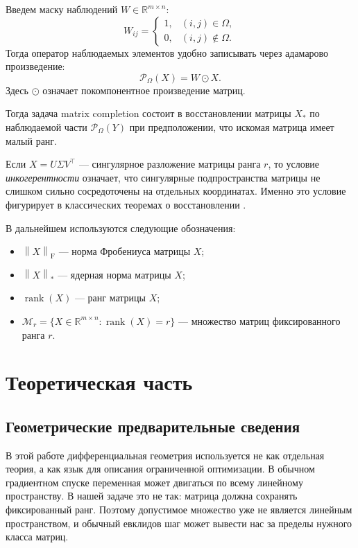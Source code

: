 \documentclass[a4paper,12pt]{article}
\newcommand{\R}{\mathbb{R}}
\newcommand{\fro}[1]{\left\lVert #1 \right\rVert_{\mathrm F}}
\newcommand{\nuc}[1]{\left\lVert #1 \right\rVert_*}
\newcommand{\rank}{\operatorname{rank}}
\renewcommand{\Proj}{\mathcal{P}}
\newcommand{\Mcal}{\mathcal{M}}
\begin{document}
\begin{definition}
Введем маску наблюдений $W\in\R^{m\times n}$:
\[
W_{ij} =
\begin{cases}
1, & (i,j)\in\Omega,\\
0, & (i,j)\notin\Omega.
\end{cases}
\]
Тогда оператор наблюдаемых элементов удобно записывать через адамарово произведение:
\[
\Proj_\Omega(X)=W\odot X.
\]
Здесь $\odot$ означает покомпонентное произведение матриц.
\end{definition}

Тогда задача matrix completion состоит в восстановлении матрицы $X_*$ по наблюдаемой части $\Proj_\Omega(Y)$ при предположении, что искомая матрица имеет малый ранг.

\begin{definition}
Если $X = U\Sigma V^\top$ --- сингулярное разложение матрицы ранга $r$, то условие \textit{инкогерентности} означает, что сингулярные подпространства матрицы не слишком сильно сосредоточены на отдельных координатах. Именно это условие фигурирует в классических теоремах о восстановлении \cite{candes-recht,candes-tao,recht}.
\end{definition}

В дальнейшем используются следующие обозначения:
\begin{itemize}
    \item $\fro{X}$ --- норма Фробениуса матрицы $X$;
    \item $\nuc{X}$ --- ядерная норма матрицы $X$;
    \item $\rank(X)$ --- ранг матрицы $X$;
    \item $\Mcal_r = \{X \in \R^{m\times n} : \rank(X)=r\}$ --- множество матриц фиксированного ранга $r$.
\end{itemize}

\newpage


\section{Теоретическая часть}
\label{sec:theory}



\iffalse

\subsection{Геометрические предварительные сведения}

В этой работе дифференциальная геометрия используется не как отдельная теория, а как язык для описания ограниченной оптимизации. В обычном градиентном спуске переменная может двигаться по всему линейному пространству. В нашей задаче это не так: матрица должна сохранять фиксированный ранг. Поэтому допустимое множество уже не является линейным пространством, и обычный евклидов шаг может вывести нас за пределы нужного класса матриц.
\end{document}
